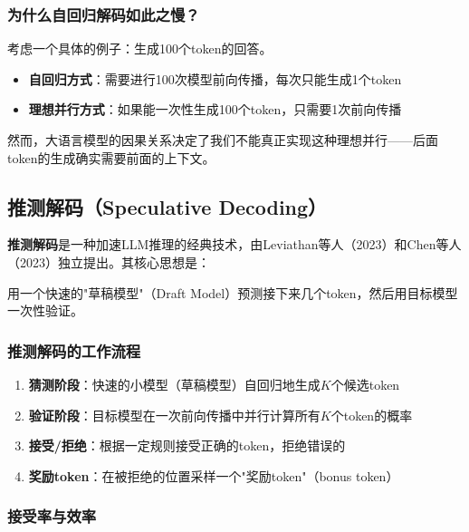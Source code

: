 \documentclass[11pt,a4paper]{article}
\newcommand{\hlblue}[1]{\textcolor{primaryblue}{\textbf{#1}}}
\newcommand{\hlorange}[1]{\textcolor{accentorange}{\textbf{#1}}}
\newcommand{\term}[1]{\textcolor{primarypurple}{\textbf{#1}}}
\begin{document}
\subsubsection{为什么自回归解码如此之慢？}

考虑一个具体的例子：生成100个token的回答。

\begin{itemize}
  \item \hlorange{自回归方式}：需要进行100次模型前向传播，每次只能生成1个token
  \item \hlorange{理想并行方式}：如果能一次性生成100个token，只需要1次前向传播
\end{itemize}

然而，大语言模型的因果关系决定了我们不能真正实现这种理想并行——后面token的生成确实需要前面的上下文。

\subsection{推测解码（Speculative Decoding）}

\term{推测解码}是一种加速LLM推理的经典技术，由Leviathan等人（2023）和Chen等人（2023）独立提出。其核心思想是：

\begin{conceptbox}[推测解码的核心思想]
  用一个快速的"草稿模型"（Draft Model）预测接下来几个token，然后用目标模型一次性验证。
\end{conceptbox}

\subsubsection{推测解码的工作流程}

\begin{enumerate}
  \item \hlblue{猜测阶段}：快速的小模型（草稿模型）自回归地生成$K$个候选token
  \item \hlblue{验证阶段}：目标模型在一次前向传播中并行计算所有$K$个token的概率
  \item \hlblue{接受/拒绝}：根据一定规则接受正确的token，拒绝错误的
  \item \hlblue{奖励token}：在被拒绝的位置采样一个"奖励token"（bonus token）
\end{enumerate}

\subsubsection{接受率与效率}
\end{document}
